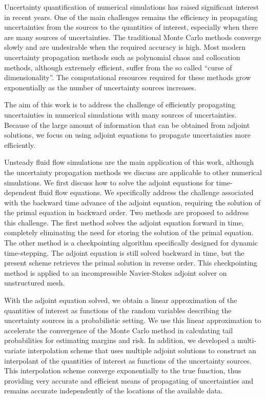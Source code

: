 Uncertainty quantification of numerical simulations has raised significant
interest in recent years.  One of the main challenges remains the
efficiency in propagating uncertainties from the sources
to the quantities of interest, especially when there are many sources of
uncertainties.  The traditional Monte Carlo methods
converge slowly and are undesirable when the required accuracy is high.
Most modern uncertainty propagation methods such as polynomial chaos and
collocation methods, although extremely efficient, suffer from the so called
``curse of dimensionality''.
The computational resources required for these methods grow exponentially
as the number of uncertainty sources increases.

The aim of this work is to address the challenge of efficiently propagating
uncertainties in numerical simulations with many sources of uncertainties.
Because of the large amount of information that can be obtained from
adjoint solutions, we focus on using adjoint
equations to propagate uncertainties more efficiently.

Unsteady fluid flow simulations are the main application of this work, although
the uncertainty propagation methods we discuss are applicable to other
numerical simulations.  We first discuss how to solve the adjoint equations
for time-dependent fluid flow equations.  We specifically address the challenge
associated with the backward time advance of the adjoint equation,
requiring the solution
of the primal equation in backward order.  Two methods are proposed to
address this challenge.  The first method solves
the adjoint equation forward in time, completely eliminating the need for
storing the solution of the primal equation.  The other method is
a checkpointing algorithm specifically designed for dynamic time-stepping.
The adjoint equation is still solved backward in time, but the present
scheme retrieves the primal solution in reverse order.
This checkpointing method is applied to an incompressible Navier-Stokes
adjoint solver on unstructured mesh.

With the adjoint equation solved, we obtain a linear approximation of
the quantities of interest as functions of the random variables describing
the uncertainty sources in a probabilistic setting.
We use this linear approximation to accelerate
the convergence of the Monte Carlo method in calculating tail probabilities
for estimating margins and risk.  In addition, we developed a
multi-variate interpolation scheme that uses multiple adjoint solutions
to construct an interpolant of the quantities of interest as functions of
the uncertainty sources.  This interpolation scheme converge
exponentially to the true function, thus providing very accurate and efficient
means of propagating of uncertainties and remains accurate independently of
the locations of the available data.


